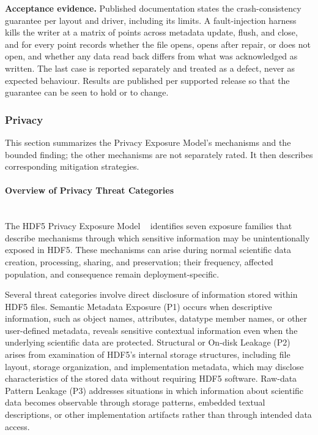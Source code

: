 \documentclass[../main.tex]{subfiles}
\begin{document}
\noindent\textbf{Acceptance evidence.}
Published documentation states the crash-consistency guarantee per layout and
driver, including its limits. A fault-injection harness kills the writer at a
matrix of points across metadata update, flush, and close, and for every point
records whether the file opens, opens after repair, or does not open, and
whether any data read back differs from what was acknowledged as written. The
last case is reported separately and treated as a defect, never as expected
behaviour. Results are published per supported release so that the guarantee
can be seen to hold or to change.

\subsubsection{Privacy}

This section summarizes the Privacy Exposure Model's mechanisms and the bounded
 finding; the other mechanisms are not separately rated.
It then describes corresponding mitigation strategies.

\paragraph{Overview of Privacy Threat Categories}\mbox{}\\

The HDF5 Privacy Exposure Model ~\cite{hdf5-privacy-exposure-model} identifies 
seven exposure families that describe mechanisms through which sensitive
information may be unintentionally exposed in HDF5. These mechanisms can arise
during normal scientific data creation, processing, sharing, and preservation;
their frequency, affected population, and consequence remain
deployment-specific.

Several threat categories involve direct disclosure of information stored within HDF5 files. 
Semantic Metadata Exposure (P1) occurs when descriptive information, such as object names, attributes,
datatype member names, or other user-defined metadata, reveals sensitive contextual 
information even when the underlying scientific data are protected. Structural or On-disk
Leakage (P2) arises from examination of HDF5's internal storage structures,
including file layout, storage organization, and implementation metadata, which may 
disclose characteristics of the stored data without requiring HDF5 software. 
Raw-data Pattern Leakage (P3) addresses situations in which information about scientific data
becomes observable through storage patterns, embedded textual descriptions, or 
other implementation artifacts rather than through intended data access.
\end{document}
